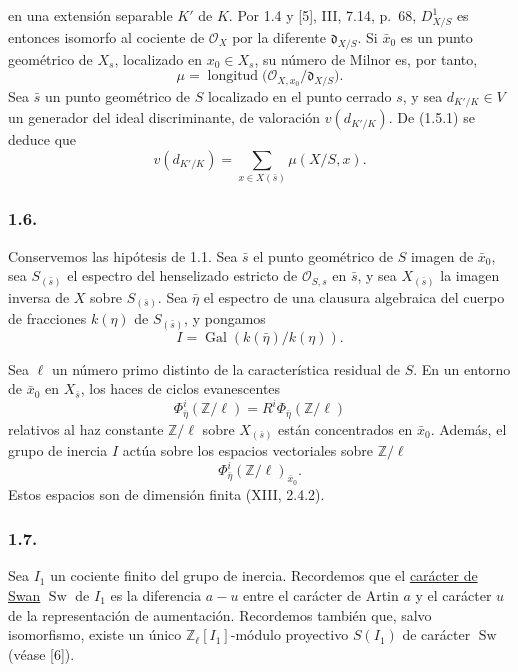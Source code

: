 \pageoriginale

en una extensión separable $K'$ de $K$. Por 1.4 y [5], III, 7.14,
p.~68, $D^1_{X/S}$ es entonces isomorfo al cociente de
$\mathcal O_X$ por la diferente $\mathfrak d_{X/S}$. Si $\bar x_0$
es un punto geométrico de $X_s$, localizado en $x_0\in X_s$, su
número de Milnor es, por tanto,
\begin{equation}\tag{1.5.1}
\mu=\operatorname{longitud}
\bigl(\mathcal O_{X,x_0}/\mathfrak d_{X/S}\bigr).
\end{equation}
Sea $\bar s$ un punto geométrico de $S$ localizado en el punto cerrado
$s$, y sea $d_{K'/K}\in V$ un generador del ideal discriminante, de
valoración $v(d_{K'/K})$. De (1.5.1) se deduce que
\begin{equation}\tag{1.5.2}
v(d_{K'/K})=\sum_{x\in X(\bar s)}\mu(X/S,x).
\end{equation}

\subsubsection*{1.6.}
Conservemos las hipótesis de 1.1. Sea $\bar s$ el punto geométrico de
$S$ imagen de $\bar x_0$, sea $S_{(\bar s)}$ el espectro del
henselizado estricto de $\mathcal O_{S,s}$ en $\bar s$, y sea
$X_{(\bar s)}$ la imagen inversa de $X$ sobre $S_{(\bar s)}$.
Sea $\bar\eta$ el espectro de una clausura algebraica del cuerpo de
fracciones $k(\eta)$ de $S_{(\bar s)}$, y pongamos
\[
I=\operatorname{Gal}(k(\bar\eta)/k(\eta)).
\]

Sea $\ell$ un número primo distinto de la característica residual de
$S$. En un entorno de $\bar x_0$ en $X_{\bar s}$, los haces de ciclos
evanescentes
\[
\Phi^i_{\bar\eta}(\mathbb Z/\ell)
=R^i\Phi_{\bar\eta}(\mathbb Z/\ell)
\]
relativos al haz constante $\mathbb Z/\ell$ sobre $X_{(\bar s)}$
están concentrados en $\bar x_0$. Además, el grupo de inercia $I$
actúa sobre los espacios vectoriales sobre $\mathbb Z/\ell$
\[
\Phi^i_{\bar\eta}(\mathbb Z/\ell)_{\bar x_0}.
\]
Estos espacios son de dimensión finita (XIII, 2.4.2).

\subsubsection*{1.7.}
Sea $I_1$ un cociente finito del grupo de inercia. Recordemos que el
\underline{carácter de Swan} $\operatorname{Sw}$ de $I_1$ es la
diferencia $a-u$ entre el carácter de Artin $a$ y el carácter $u$ de
la representación de aumentación. Recordemos también que, salvo
isomorfismo, existe un único $\mathbb Z_\ell[I_1]$-módulo proyectivo
$S(I_1)$ de carácter $\operatorname{Sw}$ (véase [6]).

